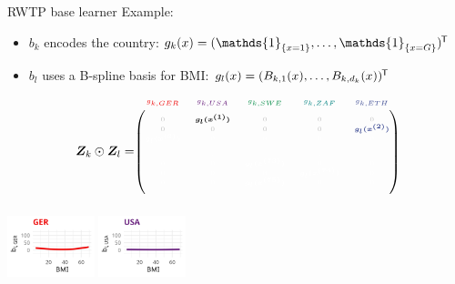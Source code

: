 \documentclass[t,10pt]{beamer}
\begin{document}
\begin{frame}{RWTP base learner}
  Example:
  \begin{itemize}
    \item $b_k$ encodes the country: $g_k(x) = (\mathds{1}_{\{x = 1\}}, \dots, \mathds{1}_{\{x = G\}})^\tran$
    \item $b_l$ uses a B-spline basis for BMI: $g_l(x) = (B_{k,1}(x), \dots, B_{k,d_k}(x))^{\mkern-1.5mu\mathsf{T}}$
  \end{itemize}
  $$
    \design_k \odot \design_l = \tiny\begin{blockarray}{ccccc}
      \color[HTML]{EE0000}g_{k,GER} & \color[HTML]{631879}g_{k,USA} & \color[HTML]{008B45}g_{k,SWE} & \color[HTML]{008280}g_{k,ZAF} & \color[HTML]{3B4992}g_{k,ETH}\\
    \begin{block}{(ccccc)}
      \phantom{x}\\
      \color{lightgray}0 & \color{black}\bm{g_l(x^{(1)})} & \color{lightgray}0 & \color{lightgray}0 & \color{lightgray}0 \\
      \color{lightgray}0 & \color{lightgray}0 & \color{lightgray}0 & \color{lightgray}0 & \color[HTML]{3B4992}\bm{g_l(x^{(2)})} \\
      \color{white}\bm{g_l(x^{(3)})} & \color{white}0 & \color{white}0 & \color{white}0 & \color{white}0 \\
      \color{white}\vdots & \color{white}\vdots & \color{white}\vdots & \color{white}\vdots & \color{white}\vdots \\
      \color{white}0 & \color{white}0 & \color{white}\bm{g_l(x^{(73)})} & \color{white}0 & \color{white}0 \\
      \color{white}0 & \color{white}0 & \color{white}0 & \color{white}\bm{g_l(x^{(74)})} & \color{white}0 \\
      \color{white}0 & \color{white}0 & \color{white}\bm{g_l(x^{(75)})} & \color{white}0 & \color{white}0 \\
      \phantom{x}\\
    \end{block}
  \end{blockarray}
  $$
  \normalsize
  {\includegraphics[width=0.19\textwidth]{figures/bs-tensor/fig-tensor-GER.png}}
  {\includegraphics[width=0.19\textwidth]{figures/bs-tensor/fig-tensor-USA.png}}

\end{frame}
\end{document}

